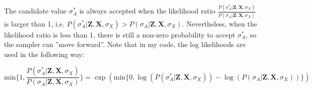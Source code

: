 The candidate value $\sigma_{A}^{*}$ is always accepted when the likelihood ratio $\frac{P(\sigma_{A}^{*} | \mathbf{Z,X},\sigma_X)}{P(\sigma_{A} | \mathbf{Z,X},\sigma_X)}$ is larger than 1, i.e. $P(\sigma_{A}^{*} | \mathbf{Z,X},\sigma_X) > P(\sigma_{A} | \mathbf{Z,X},\sigma_X)$. Nevertheless, when the likelihood ratio is less than 1, there is still a non-zero probability to accept $\sigma_{A}^{*}$, so the sampler can ''move forward''. Note that in my code, the log likelihoods are used in the following way:

\begin{equation}
\text{min}\{ 1, \dfrac{P(\sigma_{A}^{*} | \mathbf{Z,X},\sigma_X)}{P(\sigma_{A} | \mathbf{Z,X},\sigma_X)} \} = \exp(\text{min}\{0, \log(P(\sigma_{A}^{*} | \mathbf{Z,X},\sigma_X)) - \log(P(\sigma_{A} | \mathbf{Z,X},\sigma_X))\})
\end{equation}